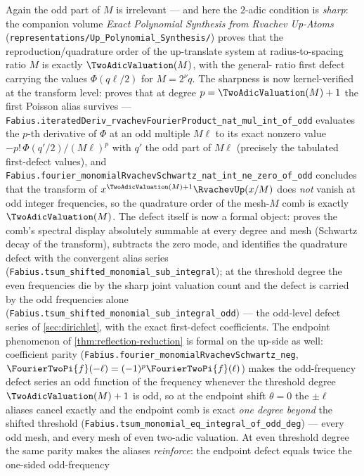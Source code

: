 Again the odd part of $M$ is irrelevant --- and here the $2$-adic
condition is \emph{sharp}: the companion volume \emph{Exact Polynomial
Synthesis from Rvachev Up-Atoms}
(\nolinkurl{representations/Up_Polynomial_Synthesis/}) proves that the
reproduction/quadrature order of the up-translate system at
radius-to-spacing ratio $M$ is exactly $\TwoAdicValuation(M)$, with the general-%
ratio first defect carrying the values $\Phi(q\ell/2)$ for $M=2^{\nu}q$.  The
sharpness is now kernel-verified at the transform level: 
proves that at degree $p=\TwoAdicValuation(M)+1$ the first Poisson alias survives ---
\nolinkurl{Fabius.iteratedDeriv_rvachevFourierProduct_nat_mul_int_of_odd} evaluates the
$p$-th derivative of $\Phi$ at an odd multiple $M\ell$ to its exact nonzero value
$-p!\,\Phi(q'/2)/(M\ell)^p$ with $q'$ the odd part of $M\ell$ (precisely the tabulated
first-defect values), and
\nolinkurl{Fabius.fourier_monomialRvachevSchwartz_nat_int_ne_zero_of_odd} concludes that
the transform of $x^{\TwoAdicValuation(M)+1}\RvachevUp(x/M)$ does \emph{not} vanish at odd integer
frequencies, so the quadrature order of the mesh-$M$ comb is exactly $\TwoAdicValuation(M)$.
The defect itself is now a formal object:  proves the comb's
spectral display absolutely summable at every degree and mesh (Schwartz decay of the
transform), subtracts the zero mode, and identifies the quadrature defect with the
convergent alias series
(\nolinkurl{Fabius.tsum_shifted_monomial_sub_integral}); at the threshold degree the even
frequencies die by the sharp joint valuation count and the defect is carried by the
odd frequencies alone (\nolinkurl{Fabius.tsum_shifted_monomial_sub_integral_odd}) --- the
odd-level defect series of \cref{sec:dirichlet}, with the exact first-defect
coefficients.  The endpoint phenomenon of \cref{thm:reflection-reduction} is formal on
the up-side as well: coefficient parity
(\nolinkurl{Fabius.fourier_monomialRvachevSchwartz_neg},
$\FourierTwoPi{f}(-\ell)=(-1)^p\FourierTwoPi{f}(\ell)$)
makes the odd-frequency defect series an odd function of the frequency whenever the
threshold degree $\TwoAdicValuation(M)+1$ is odd, so at the endpoint shift $\theta=0$ the
$\pm\ell$ aliases cancel exactly and the endpoint comb is exact \emph{one degree
beyond} the shifted threshold
(\nolinkurl{Fabius.tsum_monomial_eq_integral_of_odd_deg}) --- every odd mesh, and every
mesh of even two-adic valuation.  At even threshold degree the same parity makes the
aliases \emph{reinforce}: the endpoint defect equals twice the one-sided odd-frequency
